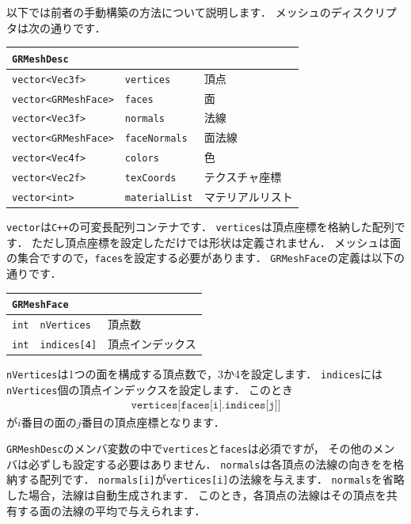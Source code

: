 \KLUDGE 以下では前者の手動構築の方法について説明します．
\KLUDGE メッシュのディスクリプタは次の通りです．
\begin{center}
\begin{tabular}{p{.3\hsize}p{.3\hsize}p{.3\hsize}}
\multicolumn{3}{l}{\texttt{GRMeshDesc}}					\\ \midrule
\texttt{vector<Vec3f>}		&	\texttt{vertices}		& 頂点	 			\\
\texttt{vector<GRMeshFace>}	&	\texttt{faces}			& 面	 			\\
\texttt{vector<Vec3f>}		&	\texttt{normals}		& 法線				\\
\texttt{vector<GRMeshFace>}	&	\texttt{faceNormals}	& 面法線			\\
\texttt{vector<Vec4f>}		&	\texttt{colors}			& 色				\\
\texttt{vector<Vec2f>}		&	\texttt{texCoords}		& テクスチャ座標	\\
\texttt{vector<int>}		&	\texttt{materialList}	& マテリアルリスト
\end{tabular}
\end{center}
\texttt{vector}は\texttt{C++}の可変長配列コンテナです．
\texttt{vertices}は頂点座標を格納した配列です．
\KLUDGE ただし頂点座標を設定しただけでは形状は定義されません．
\KLUDGE メッシュは面の集合ですので，\texttt{faces}を設定する必要があります．
\texttt{GRMeshFace}の定義は以下の通りです．
\begin{center}
\begin{tabular}{p{.3\hsize}p{.3\hsize}p{.3\hsize}}
\multicolumn{3}{l}{\texttt{GRMeshFace}}					\\ \midrule
\texttt{int}	&	\texttt{nVertices}		& 頂点数 	\\
\texttt{int}	&	\texttt{indices[4]}		& 頂点インデックス
\end{tabular}
\end{center}
\texttt{nVertices}は1つの面を構成する頂点数で，3か4を設定します．
\texttt{indices}には\texttt{nVertices}個の頂点インデックスを設定します．
\KLUDGE このとき
\begin{align*}
\texttt{vertices[faces[i].indices[j]]}
\end{align*}
\KLUDGE が$i$番目の面の$j$番目の頂点座標となります．

\texttt{GRMeshDesc}のメンバ変数の中で\texttt{vertices}と\texttt{faces}は必須ですが，
\KLUDGE その他のメンバは必ずしも設定する必要はありません．
\texttt{normals}は各頂点の法線の向きをを格納する配列です．
\texttt{normals[i]}が\texttt{vertices[i]}の法線を与えます．
\texttt{normals}を省略した場合，法線は自動生成されます．
\KLUDGE このとき，各頂点の法線はその頂点を共有する面の法線の平均で与えられます．

